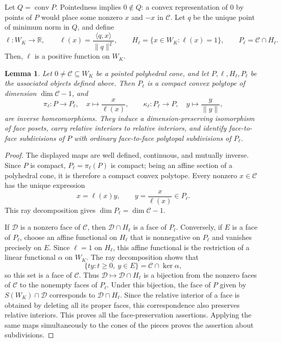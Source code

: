 \documentclass[reqno,12pt]{amsart}
\newtheorem{lemma}[theorem]{Lemma}
\theoremstyle{definition}
\DeclareMathOperator{\conv}{conv}
\begin{document}
Let $Q=\conv P$. Pointedness implies \(0\notin Q\): a convex representation of \(0\) by points of \(P\) would place some nonzero \(x\) and \(-x\) in \(\mathcal C\).  Let \(q\) be the
unique point of minimum norm in \(Q\), and define
\[
 \ell:W_K\longrightarrow\mathbb R,
 \qquad
 \ell(x)=\frac{\langle q,x\rangle}
                 {\|q\|^2},
 \qquad
 H_\ell=\{x\in W_K:\ell(x)=1\},
 \qquad
 P_\ell=\mathcal C\cap H_\ell.
\]
Then, $\ell$ is a positive function on $W_K$.

\begin{lemma}
\label{lem:spherical-affine-model}
Let \(0\ne\mathcal C\subseteq W_K\) be a pointed polyhedral cone,
and let \(P,\ell,H_\ell,P_\ell\) be the associated objects defined
above.
Then \(P_\ell\) is a compact convex polytope of dimension
\(\dim\mathcal C-1\), and
\[
 \pi_\ell:P\longrightarrow P_\ell,
 \quad x\longmapsto\frac{x}{\ell(x)},
 \qquad
 \kappa_\ell:P_\ell\longrightarrow P,
 \quad y\longmapsto\frac{y}{\|y\|},
\]
are inverse homeomorphisms.  They induce a dimension-preserving
isomorphism of face posets, carry relative interiors to relative
interiors, and identify
face-to-face subdivisions of \(P\) with ordinary face-to-face
polytopal subdivisions of \(P_\ell\).
\end{lemma}

\begin{proof}
The displayed maps are well defined, continuous, and mutually inverse.
Since \(P\) is compact, \(P_\ell=\pi_\ell(P)\) is compact; being an
affine section of a polyhedral cone, it is therefore a compact convex
polytope.  Every nonzero \(x\in\mathcal C\) has the unique expression
\[
 x=\ell(x)y,
 \qquad
 y=\frac{x}{\ell(x)}\in P_\ell.
\]
This ray decomposition gives
\(\dim P_\ell=\dim\mathcal C-1\).

If \(\mathcal D\) is a nonzero face of \(\mathcal C\), then
\(\mathcal D\cap H_\ell\) is a face of \(P_\ell\).  Conversely, if
\(E\) is a face of \(P_\ell\), choose an affine functional on
\(H_\ell\) that is nonnegative on \(P_\ell\) and vanishes precisely
on \(E\).  Since \(\ell=1\) on \(H_\ell\), this affine functional is
the restriction of a linear functional \(\alpha\) on \(W_K\).
The ray decomposition shows that
\[
 \{ty:t\geq0,\ y\in E\}=\mathcal C\cap\ker\alpha,
\]
so this set is a face of \(\mathcal C\).  Thus
\(\mathcal D\mapsto\mathcal D\cap H_\ell\)
is a bijection from the nonzero faces of \(\mathcal C\) to the
nonempty faces of \(P_\ell\).  Under this bijection, the face of \(P\)
given by \(S(W_K)\cap\mathcal D\) corresponds to
\(\mathcal D\cap H_\ell\).  Since the relative interior of a face is
obtained by deleting all its proper faces, this correspondence also
preserves relative interiors.  This proves all the face-preservation
assertions.  Applying the same maps simultaneously to the cones of
the pieces proves the assertion about subdivisions.
\end{proof}
\end{document}
